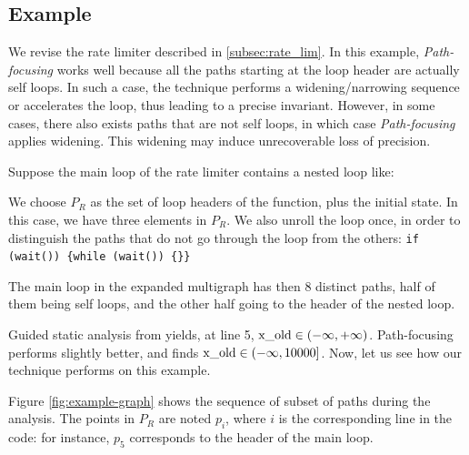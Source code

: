 \documentclass{llncs}
\begin{document}
\subsection{Example}

We revise the rate limiter described in \ref{subsec:rate_lim}. In this example,
\emph{Path-focusing} works well because all the paths starting at the
loop header are actually self loops. In such a case, the technique performs a
widening/narrowing sequence or accelerates the loop, thus leading to a precise
invariant. However, in some cases, there also exists paths that are not
self loops, in which case \emph{Path-focusing} applies widening. 
This widening may induce unrecoverable loss of precision.

Suppose the main loop of the rate limiter contains a nested loop like:


We choose $P_R$ as the set of loop headers of the function, plus the initial
state. In this case, we have three elements in $P_R$.
We also unroll the loop once, in order to distinguish the paths that do not go
through the loop from the others:
\lstinline|if (wait()) {while (wait()) {}}|


The main loop in the expanded multigraph has then 8 distinct paths, half of
them being self loops, and the other half going to the header of the nested loop.

Guided static analysis from \cite{DBLP:conf/sas/GopanR07} yields, at line 5,
$\lstinline|x_old| \in (-\infty,+\infty)$.
Path-focusing \cite{Monniaux_Gonnord_SAS11} performs slightly
better, and finds $\lstinline|x_old| \in (-\infty,10000]$.
Now, let us see how our technique performs on this example.

Figure \ref{fig:example-graph} shows the sequence of subset of paths during the
analysis. The points in $P_R$ are noted $p_i$, where $i$ is the corresponding
line in the code: for instance, $p_5$ corresponds to the header of the main
loop.
\end{document}

